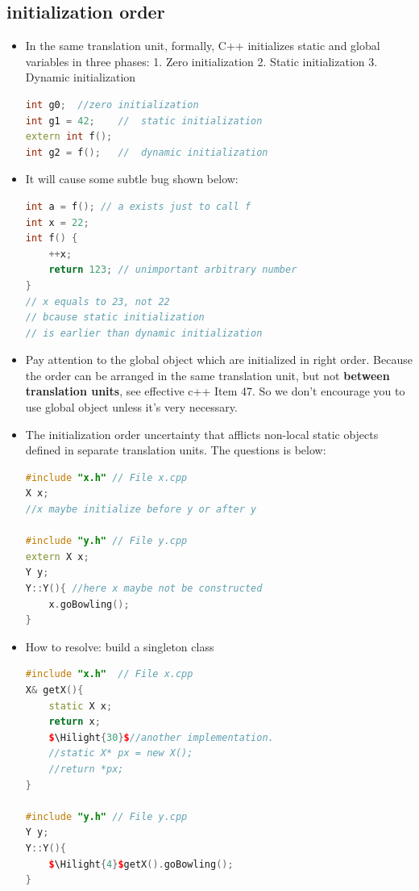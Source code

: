 \documentclass[a4paper,11pt,twoside]{book}
\newcommand{\Hilight}[1]{\makebox[0pt][l]{\color{yellow}\rule[-3pt]{#1em}{11pt}}}
\newcommand{\Hilight}[1]{}
\begin{document}
\subsection{initialization order}
\begin{itemize}
	\item In the same translation unit, formally, C++ initializes static and global variables in three phases: 1. Zero initialization 2. Static initialization 3. Dynamic initialization
	
\begin{lstlisting}[frame=single, language=c++, mathescape=true]
int g0;  //zero initialization
int g1 = 42;    //  static initialization
extern int f();
int g2 = f();   //  dynamic initialization
\end{lstlisting}
	\item It will cause some subtle bug shown below:
\begin{lstlisting}[frame=single, language=c++, mathescape=true]
int a = f(); // a exists just to call f
int x = 22;
int f() {
	++x;
	return 123; // unimportant arbitrary number
}
// x equals to 23, not 22
// bcause static initialization
// is earlier than dynamic initialization
\end{lstlisting}
	
	\item Pay attention to the global object which are initialized in right order. Because the order can be arranged in the same translation unit, but not \textbf{between translation units}, see effective c++ Item 47. So we don't encourage you to use global object unless it's very necessary.
	
	\item The initialization order uncertainty that afflicts non-local static objects defined in separate translation units. The questions is below:
	
\begin{lstlisting}[frame=single, language=c++]
#include "x.h" // File x.cpp
X x;
//x maybe initialize before y or after y
	
#include "y.h" // File y.cpp
extern X x;
Y y;
Y::Y(){ //here x maybe not be constructed
	x.goBowling();
}
\end{lstlisting}
	
	\item  How to resolve: build a singleton class
	\begin{lstlisting}[frame=single, language=c++, mathescape=true]
#include "x.h"  // File x.cpp
X& getX(){
	static X x;
	return x;
	$\Hilight{30}$//another implementation.
	//static X* px = new X();
	//return *px;
}
	
#include "y.h" // File y.cpp
Y y;
Y::Y(){
	$\Hilight{4}$getX().goBowling();
}
\end{lstlisting}
\end{itemize}
\end{document}

